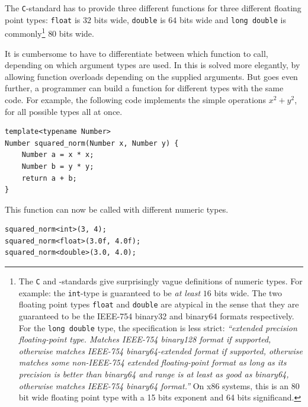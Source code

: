 The \texttt{C}-standard has to provide three different functions for three different floating point types: \texttt{float} is $32$ bits wide, \texttt{double} is $64$ bits wide and \texttt{long double} is commonly\footnote{The \texttt{C} and \cpp-standards give surprisingly vague definitions of numeric types. For example: the \texttt{int}-type is guaranteed to be \emph{at least} $16$ bits wide. The two floating point types \texttt{float} and \texttt{double} are atypical in the sense that they are guaranteed to be the IEEE-754 binary32 and binary64 formats respectively. For the \texttt{long double} type, the specification is less strict: \emph{``extended precision floating-point type. Matches IEEE-754 binary128 format if supported, otherwise matches IEEE-754 binary64-extended format if supported, otherwise matches some non-IEEE-754 extended floating-point format as long as its precision is better than binary64 and range is at least as good as binary64, otherwise matches IEEE-754 binary64 format.''} On x86 systems, this is an $80$ bit wide floating point type with a 15 bits exponent and 64 bits significand.} $80$ bits wide.

It is cumbersome to have to differentiate between which function to call, depending on which argument types are used. In \cpp{} this is solved more elegantly, by allowing function overloads depending on the supplied arguments. But \cpp{} goes even further, a programmer can build a function for different types with the same code. For example, the following code implements the simple operations $x^2 + y^2$, for all possible types all at once.
\begin{verbatim}
template<typename Number>
Number squared_norm(Number x, Number y) {
    Number a = x * x;
    Number b = y * y;
    return a + b;
}
\end{verbatim}
This function can now be called with different numeric types.
\begin{verbatim}
squared_norm<int>(3, 4);
squared_norm<float>(3.0f, 4.0f);
squared_norm<double>(3.0, 4.0);
\end{verbatim}

